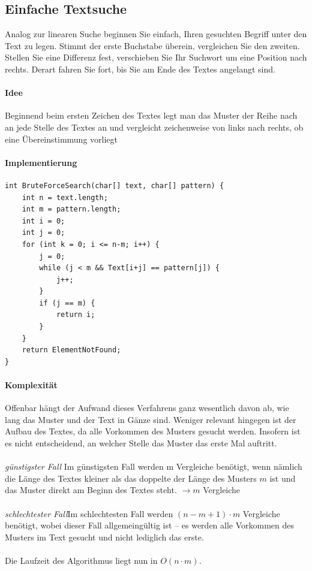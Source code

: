 \documentclass[11pt,a4paper]{scrartcl}
\begin{document}
\subsection{Einfache Textsuche}
Analog zur linearen Suche beginnen Sie einfach, Ihren gesuchten Begriff unter den Text zu legen. Stimmt der erste Buchstabe überein, vergleichen Sie den zweiten. Stellen Sie eine Differenz fest, verschieben Sie Ihr Suchwort um eine Position nach rechts. Derart fahren Sie fort, bis Sie am Ende des Textes angelangt sind.
\paragraph{Idee}
Beginnend beim ersten Zeichen des Textes legt man das Muster der Reihe nach an jede Stelle des Textes an und vergleicht zeichenweise von links nach rechts, ob eine Übereinstimmung vorliegt
\paragraph{Implementierung}
\begin{lstlisting}
int BruteForceSearch(char[] text, char[] pattern) {
	int n = text.length;
	int m = pattern.length;
	int i = 0;
	int j = 0;
	for (int k = 0; i <= n-m; i++) {
		j = 0;
		while (j < m && Text[i+j] == pattern[j]) {		
			j++;		
		}
		if (j == m) {
			return i;		
		}
	}
	return ElementNotFound;
}
\end{lstlisting}
\paragraph{Komplexität}
Offenbar hängt der Aufwand dieses Verfahrens ganz wesentlich davon ab, wie lang das Muster und der Text in Gänze sind. Weniger relevant hingegen ist der Aufbau des Textes, da alle Vorkommen des Musters gesucht werden. Insofern ist es nicht entscheidend, an welcher Stelle das Muster das erste Mal auftritt. \\\\
\textit{günstigster Fall} \quad Im günstigsten Fall werden m Vergleiche benötigt, wenn nämlich die Länge des Textes kleiner als das doppelte der Länge des Musters $m$ ist und das Muster direkt am Beginn des Textes steht. $\to m$ Vergleiche 
\\\\ \textit{schlechtester Fall}\quad Im schlechtesten Fall werden $(n-m+1) \cdot m$ Vergleiche benötigt, wobei dieser Fall allgemeingültig ist -- es werden alle Vorkommen des Musters im Text gesucht und nicht lediglich das erste. \\\\
Die Laufzeit des Algorithmus liegt nun in $O(n \cdot m)$.
\end{document}
